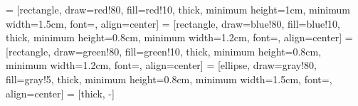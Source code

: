 
 = [rectangle, draw=red!80, fill=red!10, thick, minimum height=1cm, minimum width=1.5cm, font=\small, align=center]
 = [rectangle, draw=blue!80, fill=blue!10, thick, minimum height=0.8cm, minimum width=1.2cm, font=\small, align=center]
 = [rectangle, draw=green!80, fill=green!10, thick, minimum height=0.8cm, minimum width=1.2cm, font=\small, align=center]
 = [ellipse, draw=gray!80, fill=gray!5, thick, minimum height=0.8cm, minimum width=1.5cm, font=\small, align=center]
 = [thick, -]

\setlength{\textfloatsep}{10pt}
\setlength{\floatsep}{10pt}
\setlength{\intextsep}{10pt}
\setlength{\abovecaptionskip}{6pt}
\setlength{\belowcaptionskip}{6pt}
\setlength{\parskip}{0pt}
\setlength{\parindent}{1.5em}

\raggedbottom
